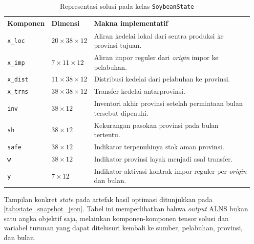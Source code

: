 \documentclass{file/TA-ITS}
\theoremstyle{definition}
\theoremstyle{definition}
\theoremstyle{plain}
\begin{document}
\begin{table}[H]
\centering
\small
\caption{Representasi solusi pada kelas \texttt{SoybeanState}}
\label{tab:soybean_state_representation}
\begin{tabularx}{\textwidth}{@{}>{\RaggedRight\arraybackslash}p{}>{\centering\arraybackslash}p{}>{\RaggedRight\arraybackslash}p{}@{}}
\toprule
\textbf{Komponen} & \textbf{Dimensi} & \textbf{Makna implementatif} \\
\midrule
\texttt{x\_loc} & $20 \times 38 \times 12$ & Aliran kedelai lokal dari sentra produksi ke provinsi tujuan. \\
\texttt{x\_imp} & $7 \times 11 \times 12$ & Aliran impor reguler dari \textit{origin} impor ke pelabuhan. \\
\texttt{x\_dist} & $11 \times 38 \times 12$ & Distribusi kedelai dari pelabuhan ke provinsi. \\
\texttt{x\_trns} & $38 \times 38 \times 12$ & Transfer kedelai antarprovinsi. \\
\texttt{inv} & $38 \times 12$ & Inventori akhir provinsi setelah permintaan bulan tersebut dipenuhi. \\
\texttt{sh} & $38 \times 12$ & Kekurangan pasokan provinsi pada bulan tertentu. \\
\texttt{safe} & $38 \times 12$ & Indikator terpenuhinya stok aman provinsi. \\
\texttt{w} & $38 \times 12$ & Indikator provinsi layak menjadi asal transfer. \\
\texttt{y} & $7 \times 12$ & Indikator aktivasi kontrak impor reguler per \textit{origin} dan bulan. \\
\bottomrule
\end{tabularx}
\end{table}

Tampilan konkret \textit{state} pada artefak hasil optimasi ditunjukkan pada \ref{tab:state_snapshot_json}. Tabel ini memperlihatkan bahwa \textit{output} ALNS bukan satu angka objektif saja, melainkan komponen-komponen tensor solusi dan variabel turunan yang dapat ditelusuri kembali ke sumber, pelabuhan, provinsi, dan bulan.
\end{document}

